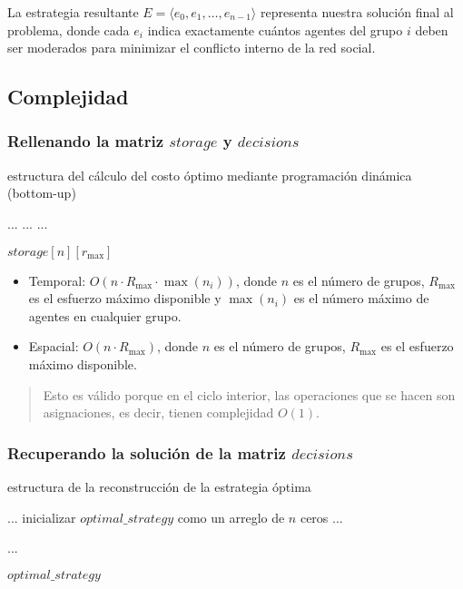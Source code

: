La estrategia resultante $E = \langle e_0,e_1,\ldots,e_{ n - 1 } \rangle$ representa nuestra solución final al problema, donde cada $e_i$ indica exactamente cuántos agentes del grupo $i$ deben ser moderados para minimizar el conflicto interno de la red social.

\subsection{Complejidad}

\subsubsection{Rellenando la matriz $storage$ y $decisions$}

\begin{algorithm}[H]
	\caption{estructura del cálculo del costo óptimo mediante programación dinámica (bottom-up)}
	\begin{algorithmic}[1]
		\State ...
			\State ...
					\State ...
				\EndFor
			\EndFor
		\EndFor

		\State \Return $storage[n][r_{ \max }]$
	\end{algorithmic}
\end{algorithm}

\begin{itemize}
	\item Temporal: $O(n \cdot R_{ \max } \cdot \max(n_i))$, donde $n$ es el número de grupos, $R_{ \max }$ es el esfuerzo máximo disponible y $\max(n_i)$ es el número máximo de agentes en cualquier grupo.
	\item Espacial: $O(n \cdot R_{ \max })$, donde $n$ es el número de grupos, $R_{ \max }$ es el esfuerzo máximo disponible.
\end{itemize}

\begin{quote}
	Esto es válido porque en el ciclo interior, las operaciones que se hacen son asignaciones, es decir, tienen complejidad $O(1)$.
\end{quote}

\subsubsection{Recuperando la solución de la matriz $decisions$}

\begin{algorithm}[H]
	\caption{estructura de la reconstrucción de la estrategia óptima}
	\begin{algorithmic}[1]
		\State ...
		\State inicializar $optimal\_strategy$ como un arreglo de $n$ ceros
		\State ...

			\State ...
		\EndFor

		\State \Return $optimal\_strategy$
	\end{algorithmic}
\end{algorithm}

